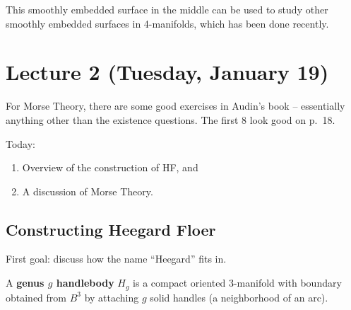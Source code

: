 \begin{remark}

This smoothly embedded surface in the middle can be used to study other
smoothly embedded surfaces in 4-manifolds, which has been done recently.

\end{remark}

\hypertarget{lecture-2-tuesday-january-19}{%
\section{Lecture 2 (Tuesday, January
19)}\label{lecture-2-tuesday-january-19}}


\begin{remark}

For Morse Theory, there are some good exercises in Audin's book --
essentially anything other than the existence questions. The first 8
look good on p.~18.

\end{remark}

Today:

\begin{enumerate}
\def\labelenumi{\arabic{enumi}.}
\item
  Overview of the construction of HF, and
\item
  A discussion of Morse Theory.
\end{enumerate}

\hypertarget{constructing-heegard-floer}{%
\subsection{Constructing Heegard
Floer}\label{constructing-heegard-floer}}

First goal: discuss how the name ``Heegard'' fits in.

\begin{definition}

A \textbf{genus \(g\) handlebody} \(H_g\) is a compact oriented
3-manifold with boundary obtained from \(B^3\) by attaching \(g\) solid
handles (a neighborhood of an arc).

\end{definition}

